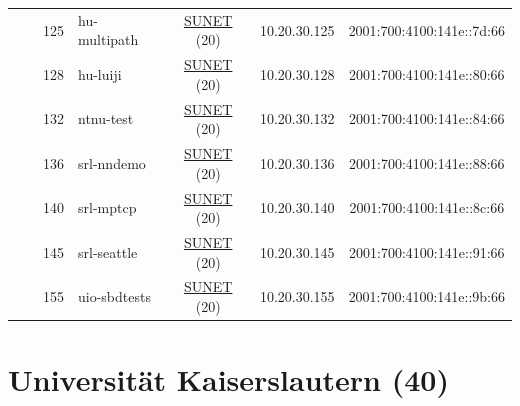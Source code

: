 \begin{small}
\begin{center}
\begin{longtable}{|c|c|c|c|c|c|c|c|}
  &  & \tiny{125} & \multicolumn{1}{|l|}{\tiny{hu-multipath}} & \multicolumn{2}{|c|}{\tiny{\href{http://www.sunet.se}{SUNET} (20)}} & \tiny{10.20.30.125} & \tiny{2001:700:4100:141e::7d:66} \\* \cline{3-3}\cline{4-4}\cline{5-5}\cline{6-6}\cline{7-7}\cline{8-8}
  &  & \tiny{128} & \multicolumn{1}{|l|}{\tiny{hu-luiji}} & \multicolumn{2}{|c|}{\tiny{\href{http://www.sunet.se}{SUNET} (20)}} & \tiny{10.20.30.128} & \tiny{2001:700:4100:141e::80:66} \\* \cline{3-3}\cline{4-4}\cline{5-5}\cline{6-6}\cline{7-7}\cline{8-8}
  &  & \tiny{132} & \multicolumn{1}{|l|}{\tiny{ntnu-test}} & \multicolumn{2}{|c|}{\tiny{\href{http://www.sunet.se}{SUNET} (20)}} & \tiny{10.20.30.132} & \tiny{2001:700:4100:141e::84:66} \\* \cline{3-3}\cline{4-4}\cline{5-5}\cline{6-6}\cline{7-7}\cline{8-8}
  &  & \tiny{136} & \multicolumn{1}{|l|}{\tiny{srl-nndemo}} & \multicolumn{2}{|c|}{\tiny{\href{http://www.sunet.se}{SUNET} (20)}} & \tiny{10.20.30.136} & \tiny{2001:700:4100:141e::88:66} \\* \cline{3-3}\cline{4-4}\cline{5-5}\cline{6-6}\cline{7-7}\cline{8-8}
  &  & \tiny{140} & \multicolumn{1}{|l|}{\tiny{srl-mptcp}} & \multicolumn{2}{|c|}{\tiny{\href{http://www.sunet.se}{SUNET} (20)}} & \tiny{10.20.30.140} & \tiny{2001:700:4100:141e::8c:66} \\* \cline{3-3}\cline{4-4}\cline{5-5}\cline{6-6}\cline{7-7}\cline{8-8}
  &  & \tiny{145} & \multicolumn{1}{|l|}{\tiny{srl-seattle}} & \multicolumn{2}{|c|}{\tiny{\href{http://www.sunet.se}{SUNET} (20)}} & \tiny{10.20.30.145} & \tiny{2001:700:4100:141e::91:66} \\* \cline{3-3}\cline{4-4}\cline{5-5}\cline{6-6}\cline{7-7}\cline{8-8}
  &  & \tiny{155} & \multicolumn{1}{|l|}{\tiny{uio-sbdtests}} & \multicolumn{2}{|c|}{\tiny{\href{http://www.sunet.se}{SUNET} (20)}} & \tiny{10.20.30.155} & \tiny{2001:700:4100:141e::9b:66} \\ \hline
\end{longtable}
\end{center}
\end{small}



\section{Universität Kaiserslautern (40)}
\label{sec:TUKL}

